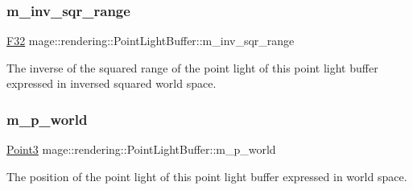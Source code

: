\subsubsection{\texorpdfstring{m\+\_\+inv\+\_\+sqr\+\_\+range}{m\_inv\_sqr\_range}}
{\footnotesize\ttfamily \mbox{\hyperlink{namespacemage_aa97e833b45f06d60a0a9c4fc22ae02c0}{F32}} mage\+::rendering\+::\+Point\+Light\+Buffer\+::m\+\_\+inv\+\_\+sqr\+\_\+range}

The inverse of the squared range of the point light of this point light buffer expressed in inversed squared world space. \mbox{\label{structmage_1_1rendering_1_1_point_light_buffer_abbc64dd98dec18dadc0a3c0003c0e750}} 
\subsubsection{\texorpdfstring{m\+\_\+p\+\_\+world}{m\_p\_world}}
{\footnotesize\ttfamily \mbox{\hyperlink{structmage_1_1_point3}{Point3}} mage\+::rendering\+::\+Point\+Light\+Buffer\+::m\+\_\+p\+\_\+world}

The position of the point light of this point light buffer expressed in world space. 